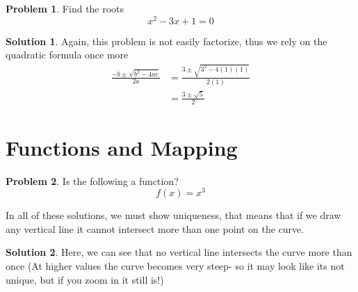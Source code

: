 \documentclass[a4paper]{article}
\theoremstyle{definition}
\newtheorem{problem}{Problem}[section]
\newtheorem*{solution}{Solution}
\begin{document}
\begin{problem}
Find the roots
\[
x^2 - 3x + 1 = 0
\]
\end{problem}
\begin{solution}
Again, this problem is not easily factorize, thus we rely on the quadratic formula once more
\begin{align*}
\frac{-b \pm \sqrt{b^2 - 4ac}}{2a} &= \frac{3 \pm \sqrt{3^2 - 4(1)(1)}}{2(1)} \\
    &= \frac{3 \pm \sqrt{5}}{2}
\end{align*}
\end{solution}

\section{Functions and Mapping}

\begin{problem} Is the following a function?
\[
f(x) = x^3
\]
\end{problem}
In all of these solutions, we must show uniqueness, that means that if we draw any vertical line it cannot intersect more than one point on the curve. \\

\begin{solution}
Here, we can see that no vertical line intersects the curve more than once (At higher values the curve becomes very steep- so it may look like its not unique, but if you zoom in it still is!)
\end{solution}
\end{document}
